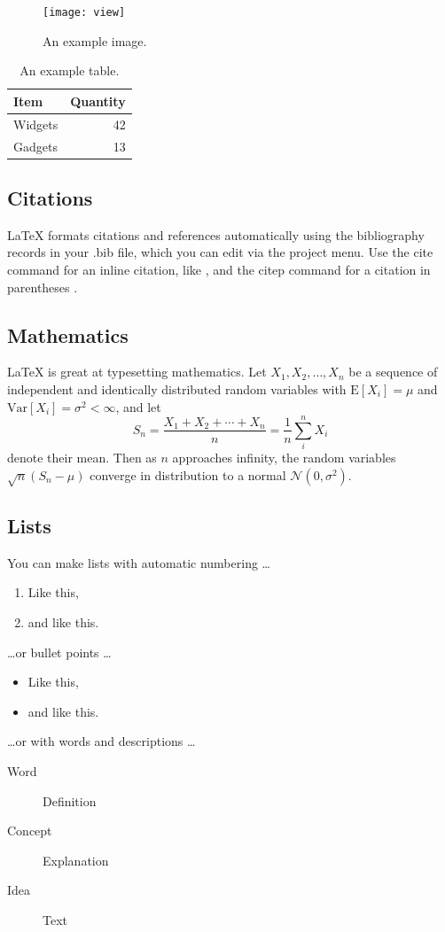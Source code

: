 \documentclass[fleqn,10pt]{wlpeerj} %
\begin{document}
\begin{figure}[ht]
\centering
\texttt{[image: view]}
\caption{An example image.}
\label{fig:view}
\end{figure}

\begin{table}[ht]
\centering
\begin{tabular}{l|r}
Item & Quantity \\\hline
Widgets & 42 \\
Gadgets & 13
\end{tabular}
\caption{\label{tab:widgets}An example table.}
\end{table}

\subsection*{Citations}

LaTeX formats citations and references automatically using the bibliography records in your .bib file, which you can edit via the project menu. Use the cite command for an inline citation, like \cite{Figueredo:2009dg}, and the citep command for a citation in parentheses \citep{Figueredo:2009dg}.

\subsection*{Mathematics}

\LaTeX{} is great at typesetting mathematics. Let $X_1, X_2, \ldots, X_n$ be a sequence of independent and identically distributed random variables with $\text{E}[X_i] = \mu$ and $\text{Var}[X_i] = \sigma^2 < \infty$, and let
$$S_n = \frac{X_1 + X_2 + \cdots + X_n}{n}
      = \frac{1}{n}\sum_{i}^{n} X_i$$
denote their mean. Then as $n$ approaches infinity, the random variables $\sqrt{n}(S_n - \mu)$ converge in distribution to a normal $\mathcal{N}(0, \sigma^2)$.

\subsection*{Lists}

You can make lists with automatic numbering \dots

\begin{enumerate}[noitemsep] 
\item Like this,
\item and like this.
\end{enumerate}
\dots or bullet points \dots
\begin{itemize}[noitemsep] 
\item Like this,
\item and like this.
\end{itemize}
\dots or with words and descriptions \dots
\begin{description}
\item[Word] Definition
\item[Concept] Explanation
\item[Idea] Text
\end{description}
\end{document}
